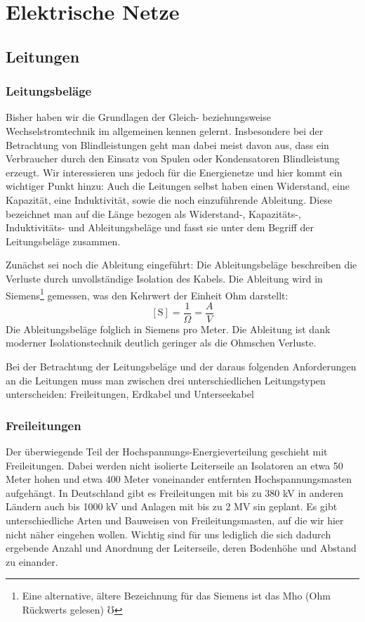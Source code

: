 \section{Elektrische Netze}
\subsection{Leitungen}

\subsubsection{Leitungsbeläge}
Bisher haben wir die Grundlagen der Gleich- beziehungsweise Wechselstromtechnik im allgemeinen kennen gelernt.
Insbesondere bei der Betrachtung von Blindleistungen geht man dabei meist davon aus,
dass ein Verbraucher durch den Einsatz von Spulen oder Kondensatoren Blindleistung erzeugt.
Wir interessieren uns jedoch für die Energienetze und hier kommt ein wichtiger Punkt hinzu:
Auch die Leitungen selbst haben einen Widerstand, eine Kapazität, eine Induktivität, sowie die noch einzuführende Ableitung.
Diese bezeichnet man auf die Länge bezogen als Widerstand-, Kapazitäts-, Induktivitäts- und Ableitungsbeläge und fasst sie unter dem Begriff der Leitungsbeläge zusammen.

Zunächst sei noch die Ableitung eingeführt: Die Ableitungsbeläge beschreiben die Verluste durch unvollständige Isolation des Kabels. Die Ableitung wird in Siemens\footnote{Eine alternative, ältere Bezeichnung für das Siemens ist das Mho (Ohm Rückwerts gelesen) $\mho$ } gemessen, was den Kehrwert der Einheit Ohm darstellt:
\begin{equation}
\mathrm{[S]} = \frac{1}{\Omega} = \frac{A}{V}
\end{equation}
Die Ableitungsbeläge folglich in Siemens pro Meter.
Die Ableitung ist dank moderner Isolationstechnik deutlich geringer als die Ohmschen Verluste.

Bei der Betrachtung der Leitungsbeläge und der daraus folgenden Anforderungen an die Leitungen muss man zwischen drei unterschiedlichen Leitungstypen unterscheiden: Freileitungen, Erdkabel und Unterseekabel %

\subsubsection{Freileitungen}
Der überwiegende Teil der Hochspannungs-Energieverteilung geschieht mit Freileitungen.
Dabei werden nicht isolierte Leiterseile an Isolatoren an etwa 50 Meter hohen und etwa 400 Meter voneinander entfernten Hochspannungsmasten aufgehängt. %
In Deutschland gibt es Freileitungen mit bis zu 380 kV in anderen Ländern auch bis 1000 kV und Anlagen mit bis zu 2 MV sin geplant\cite{Flosdorff}.
Es gibt unterschiedliche Arten und Bauweisen von Freileitungsmasten, auf die wir hier nicht näher eingehen wollen. Wichtig sind für uns lediglich die sich dadurch ergebende Anzahl und Anordnung der Leiterseile, deren Bodenhöhe und Abstand zu einander.

